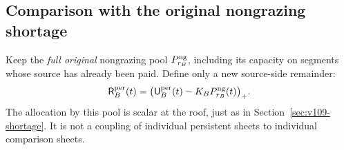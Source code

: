 \subsection{Comparison with the original nongrazing shortage}
Keep the \emph{full original} nongrazing pool $P_{r_B}^{\rm ng}$,
including its capacity on segments whose source has already been
paid. Define only a new source-side remainder:
\begin{equation}\label{eq:v110-persistent-residual}
 \mathsf R_B^{\rm per}(t)
   =\bigl(\mathsf U_B^{\rm per}(t)
                         -K_BP_{r_B}^{\rm ng}(t)\bigr)_+.
\end{equation}
The allocation by this pool is scalar at the roof, just as in
Section~\ref{sec:v109-shortage}. It is not a coupling of individual
persistent sheets to individual comparison sheets.

